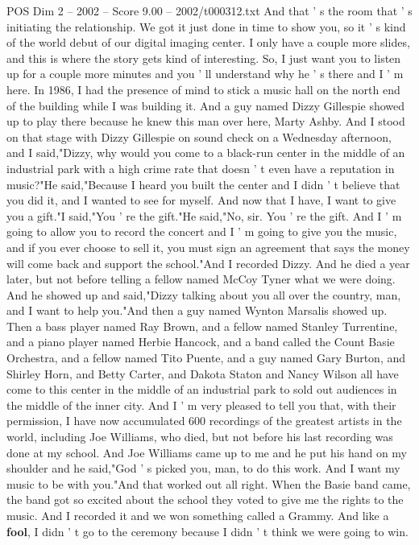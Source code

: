 \begin{textsample}{POS Dim 2 – 2002 – Score 9.00 – 2002/t000312.txt}
And that ' s the room that ' s initiating the relationship.
We got it just done in time to show you, so it ' s kind of the world debut of our digital imaging center.
I only have a couple more slides, and this is where the story gets kind of interesting.
So, I just want you to listen up for a couple more minutes and you ' ll understand why he ' s there and I ' m here.
In 1986, I had the presence of mind to stick a music hall on the north end of the building while I was building it.
And a guy named Dizzy Gillespie showed up to play there because he knew this man over here, Marty Ashby.
And I stood on that stage with Dizzy Gillespie on sound check on a Wednesday afternoon, and I said,"Dizzy, why would you come to a black-run center in the middle of an industrial park with a high crime rate that doesn ' t even have a reputation in music?"He said,"Because I heard you built the center and I didn ' t believe that you did it, and I wanted to see for myself.
And now that I have, I want to give you a gift."I said,"You ' re the gift."He said,"No, sir.
You ' re the gift.
And I ' m going to allow you to record the concert and I ' m going to give you the music, and if you ever choose to sell it, you must sign an agreement that says the money will come back and support the school."And I recorded Dizzy.
And he died a year later, but not before telling a fellow named McCoy Tyner what we were doing.
And he showed up and said,"Dizzy talking about you all over the country, man, and I want to help you."And then a guy named Wynton Marsalis showed up.
Then a bass player named Ray Brown, and a fellow named Stanley Turrentine, and a piano player named Herbie Hancock, and a band called the Count Basie Orchestra, and a fellow named Tito Puente, and a guy named Gary Burton, and Shirley Horn, and Betty Carter, and Dakota Staton and Nancy Wilson all have come to this center in the middle of an industrial park to sold out audiences in the middle of the inner city.
And I ' m very pleased to tell you that, with their permission, I have now accumulated 600 recordings of the greatest artists in the world, including Joe Williams, who died, but not before his last recording was done at my school.
And Joe Williams came up to me and he put his hand on my shoulder and he said,"God ' s picked you, man, to do this work.
And I want my music to be with you."And that worked out all right.
When the Basie band came, the band got so excited about the school they voted to give me the rights to the music.
And I recorded it and we won something called a Grammy.
And like a \textbf{fool}, I didn ' t go to the ceremony because I didn ' t think we were going to win.

\end{textsample}
